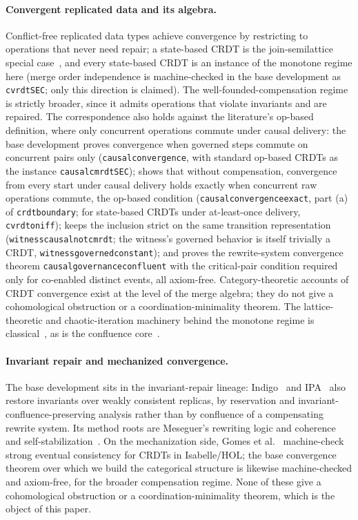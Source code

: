 \documentclass[11pt,a4paper]{article}
\theoremstyle{plain}
\theoremstyle{definition}
\theoremstyle{remark}
\renewcommand{\_}{\origunderscore\allowbreak}
\begin{document}
\paragraph{Convergent replicated data and its algebra.}
Conflict-free replicated data types achieve convergence by restricting to operations that never need
repair; a state-based CRDT is the join-semilattice special case~\cite{shapiro2011crdt}, and every
state-based CRDT is an instance of the monotone regime here (merge order independence is
machine-checked in the base development as \texttt{cvrdt\_SEC}; only this direction is claimed). The
well-founded-compensation regime is strictly broader, since it admits operations
that violate invariants and are repaired. The correspondence also holds against the literature's
op-based definition, where only concurrent operations commute under causal delivery: the base
development proves convergence when governed steps commute on concurrent pairs only
(\texttt{causal\_convergence}, with standard op-based CRDTs as the instance
\texttt{causal\_cmrdt\_SEC}); shows that without compensation, convergence from every start under
causal delivery holds exactly when concurrent raw operations commute, the op-based condition
(\texttt{causal\_convergence\_exact}, part (a) of \texttt{crdt\_boundary}; for state-based CRDTs
under at-least-once delivery, \texttt{cvrdt\_on\_iff}); keeps the inclusion strict on the same
transition representation (\texttt{witness\_causal\_not\_cmrdt}; the witness's governed behavior is
itself trivially a CRDT, \texttt{witness\_governed\_constant}); and proves the rewrite-system convergence theorem
\texttt{causal\_governance\_confluent} with the critical-pair condition required only for
co-enabled distinct events, all axiom-free. Category-theoretic accounts of CRDT convergence exist at
the level of the merge algebra; they do not give a cohomological obstruction or a
coordination-minimality theorem. The lattice-theoretic and chaotic-iteration machinery behind the
monotone regime is classical~\cite{tarski1955, cousot1977}, as is the confluence core~\cite{newman1942}.

\paragraph{Invariant repair and mechanized convergence.}
The base development sits in the invariant-repair lineage: Indigo~\cite{balegas2015indigo} and
IPA~\cite{balegas2019ipa} also restore invariants over weakly consistent replicas, by reservation and
invariant-confluence-preserving analysis rather than by confluence of a compensating rewrite system.
Its method roots are Meseguer's rewriting logic and coherence~\cite{meseguer1992, duran2012coherence}
and self-stabilization~\cite{dijkstra1974}. On the mechanization side, Gomes et
al.~\cite{gomes2017verifying} machine-check strong eventual consistency for CRDTs in Isabelle/HOL; the
base convergence theorem over which we build the categorical structure is likewise machine-checked and
axiom-free, for the broader compensation regime. None of these give a cohomological obstruction or a
coordination-minimality theorem, which is the object of this paper.
\end{document}
